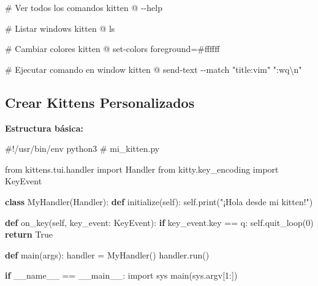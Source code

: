 \documentclass[
  doc,
  floatsintext,
  longtable,
  a4paper,
  nolmodern,
  notxfonts,
  notimes,
  12pt,
  colorlinks=true,linkcolor=blue,citecolor=blue,urlcolor=blue]{apa7}
\newenvironment{Shaded}{\begin{snugshade}}{\end{snugshade}}
\newcommand{\AttributeTok}[1]{\textcolor[rgb]{0.40,0.45,0.13}{#1}}
\newcommand{\BuiltInTok}[1]{\textcolor[rgb]{0.00,0.23,0.31}{#1}}
\newcommand{\CommentTok}[1]{\textcolor[rgb]{0.37,0.37,0.37}{#1}}
\newcommand{\ControlFlowTok}[1]{\textcolor[rgb]{0.00,0.23,0.31}{\textbf{#1}}}
\newcommand{\DecValTok}[1]{\textcolor[rgb]{0.68,0.00,0.00}{#1}}
\newcommand{\ExtensionTok}[1]{\textcolor[rgb]{0.00,0.23,0.31}{#1}}
\newcommand{\ImportTok}[1]{\textcolor[rgb]{0.00,0.46,0.62}{#1}}
\newcommand{\KeywordTok}[1]{\textcolor[rgb]{0.00,0.23,0.31}{\textbf{#1}}}
\newcommand{\NormalTok}[1]{\textcolor[rgb]{0.00,0.23,0.31}{#1}}
\newcommand{\OperatorTok}[1]{\textcolor[rgb]{0.37,0.37,0.37}{#1}}
\newcommand{\StringTok}[1]{\textcolor[rgb]{0.13,0.47,0.30}{#1}}
\newcommand{\VariableTok}[1]{\textcolor[rgb]{0.07,0.07,0.07}{#1}}
\begin{document}
\begin{Shaded}
\begin{Highlighting}[]
\CommentTok{\# Ver todos los comandos}
\ExtensionTok{kitten}\NormalTok{ @ }\AttributeTok{{-}{-}help}

\CommentTok{\# Listar windows}
\ExtensionTok{kitten}\NormalTok{ @ ls}

\CommentTok{\# Cambiar colores}
\ExtensionTok{kitten}\NormalTok{ @ set{-}colors foreground=\#ffffff}

\CommentTok{\# Ejecutar comando en window}
\ExtensionTok{kitten}\NormalTok{ @ send{-}text }\AttributeTok{{-}{-}match} \StringTok{"title:vim"} \StringTok{":wq\textbackslash{}n"}
\end{Highlighting}
\end{Shaded}

\subsection{Crear Kittens
Personalizados}\label{crear-kittens-personalizados}

\textbf{Estructura básica:}

\begin{Shaded}
\begin{Highlighting}[]
\CommentTok{\#!/usr/bin/env python3}
\CommentTok{\# mi\_kitten.py}

\ImportTok{from}\NormalTok{ kittens.tui.handler }\ImportTok{import}\NormalTok{ Handler}
\ImportTok{from}\NormalTok{ kitty.key\_encoding }\ImportTok{import}\NormalTok{ KeyEvent}

\KeywordTok{class}\NormalTok{ MyHandler(Handler):}
    \KeywordTok{def}\NormalTok{ initialize(}\VariableTok{self}\NormalTok{):}
        \VariableTok{self}\NormalTok{.}\BuiltInTok{print}\NormalTok{(}\StringTok{"¡Hola desde mi kitten!"}\NormalTok{)}
    
    \KeywordTok{def}\NormalTok{ on\_key(}\VariableTok{self}\NormalTok{, key\_event: KeyEvent):}
        \ControlFlowTok{if}\NormalTok{ key\_event.key }\OperatorTok{==} \StringTok{\textquotesingle{}q\textquotesingle{}}\NormalTok{:}
            \VariableTok{self}\NormalTok{.quit\_loop(}\DecValTok{0}\NormalTok{)}
        \ControlFlowTok{return} \VariableTok{True}

\KeywordTok{def}\NormalTok{ main(args):}
\NormalTok{    handler }\OperatorTok{=}\NormalTok{ MyHandler()}
\NormalTok{    handler.run()}

\ControlFlowTok{if} \VariableTok{\_\_name\_\_} \OperatorTok{==} \StringTok{\textquotesingle{}\_\_main\_\_\textquotesingle{}}\NormalTok{:}
    \ImportTok{import}\NormalTok{ sys}
\NormalTok{    main(sys.argv[}\DecValTok{1}\NormalTok{:])}
\end{Highlighting}
\end{Shaded}
\end{document}
